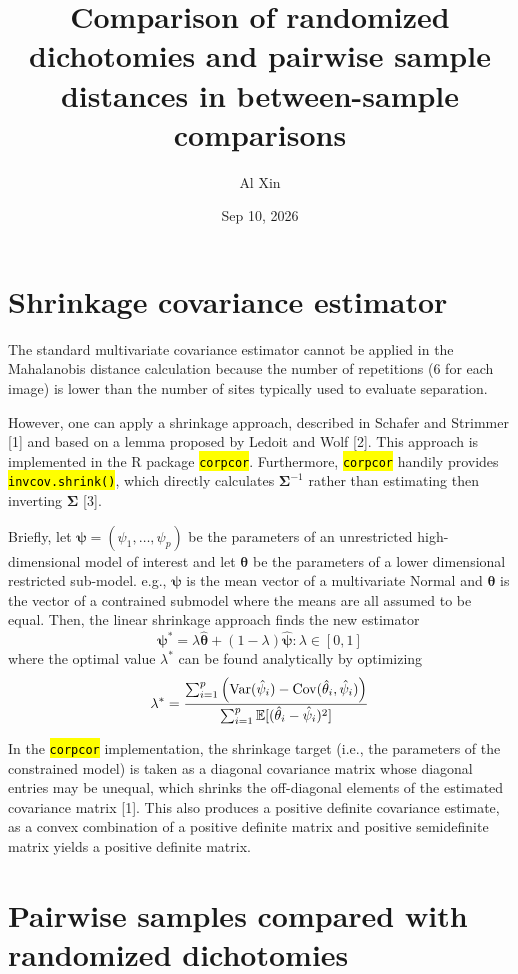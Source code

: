 \documentclass[
  10pt,
  letterpaper,
  DIV=11,
  numbers=noendperiod]{scrartcl}
\title{Comparison of randomized dichotomies and pairwise sample
distances in between-sample comparisons}
\author{Al Xin}
\date{Sep 10, 2026}
\let\OldTexttt\texttt
\renewcommand{\texttt}[1]{\OldTexttt{\hl{#1}}}
\begin{document}
\maketitle


\section{Shrinkage covariance
estimator}\label{shrinkage-covariance-estimator}

The standard multivariate covariance estimator cannot be applied in the
Mahalanobis distance calculation because the number of repetitions (6
for each image) is lower than the number of sites typically used to
evaluate separation.

However, one can apply a shrinkage approach, described in Schafer and
Strimmer {[}1{]} and based on a lemma proposed by Ledoit and Wolf
{[}2{]}. This approach is implemented in the R package \texttt{corpcor}.
Furthermore, \texttt{corpcor} handily provides \texttt{invcov.shrink()},
which directly calculates \(\boldsymbol{\Sigma}^{-1}\) rather than
estimating then inverting \(\boldsymbol{\Sigma}\) {[}3{]}.

Briefly, let \(\boldsymbol{\psi} = (\psi_1, \dots, \psi_p)\) be the
parameters of an unrestricted high-dimensional model of interest and let
\(\boldsymbol{\theta}\) be the parameters of a lower dimensional
restricted sub-model. e.g., \(\boldsymbol{\psi}\) is the mean vector of
a multivariate Normal and \(\boldsymbol{\theta}\) is the vector of a
contrained submodel where the means are all assumed to be equal. Then,
the linear shrinkage approach finds the new estimator \[
\boldsymbol{\psi}^* = \lambda \hat{\boldsymbol{\theta}} + (1 - \lambda) \hat{\boldsymbol{\psi}} : \lambda \in [0, 1]
\] where the optimal value \(\lambda^*\) can be found analytically by
optimizing \[
\lambda^* = 
\frac
{\sum_{i = 1}^p \left( \operatorname*{Var} (\hat\psi_i) - \operatorname*{Cov} (\hat\theta_i, \hat\psi_i) \right)}
{\sum_{i = 1}^p \mathbb{E} [(\hat\theta_i - \hat\psi_i)^2]}
\]

In the \texttt{corpcor} implementation, the shrinkage target (i.e., the
parameters of the constrained model) is taken as a diagonal covariance
matrix whose diagonal entries may be unequal, which shrinks the
off-diagonal elements of the estimated covariance matrix {[}1{]}. This
also produces a positive definite covariance estimate, as a convex
combination of a positive definite matrix and positive semidefinite
matrix yields a positive definite matrix.

\section{Pairwise samples compared with randomized
dichotomies}\label{pairwise-samples-compared-with-randomized-dichotomies}
\end{document}
